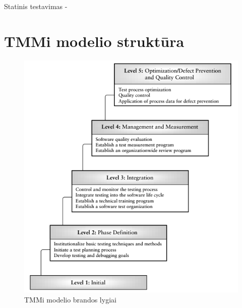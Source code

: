 \documentclass{VUMIFPSkursinis}
\begin{document}
Statinis testavimas - 


\appendix  %

\section{TMMi modelio struktūra}
\begin{figure}[H]
    \centering
    \includegraphics[scale=0.85]{img/TMMI}
    \caption{TMMi modelio brandos lygiai \cite{Burnstein:2010:PST:1965566}}
    \label{img:tmmi}
\end{figure}
\end{document}
